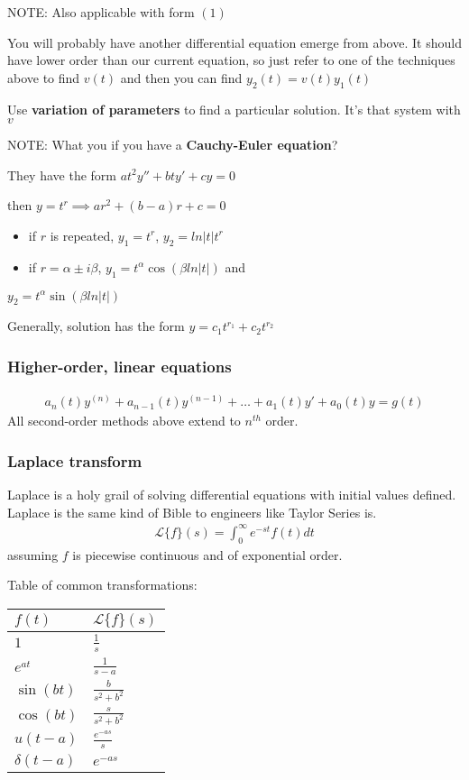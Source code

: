 \documentclass[12pt]{article}
\begin{document}
NOTE: Also applicable with form \((1)\)

You will probably have another differential equation emerge from above. It
should have lower order than our current equation, so just refer to one of
the techniques above to find \(v(t)\) and then you can find
\(y_2(t)=v(t)y_1(t)\)

Use \textbf{variation of parameters} to find a particular solution. It's that
system with \(v\)

NOTE: What you if you have a \textbf{Cauchy-Euler equation}?

They have the form \(at^2y''+bty'+cy=0\)

then \(y=t^r \implies ar^2+(b-a)r+c=0\)

\begin{itemize}
\item if \(r\) is repeated, \(y_1=t^r\), \(y_2=ln|t|t^r\)
\item if \(r=\alpha\pm i\beta\), \(y_1=t^{\alpha}\cos(\beta ln|t|)\) and
\end{itemize}
\(y_2=t^{\alpha}\sin(\beta ln|t|)\)

Generally, solution has the form \(y=c_1t^{r_1}+c_2t^{r_2}\)

\subsubsection*{Higher-order, linear equations}
\label{sec:org49301f3}
\begin{align*}
	a_n(t)y^{(n)}+a_{n-1}(t)y^{(n-1)}+\ldots+a_1(t)y'+a_0(t)y=g(t)
\end{align*}
All second-order methods above extend to \(n^{th}\) order.

\subsubsection*{Laplace transform}
\label{sec:org459359c}
Laplace is a holy grail of solving differential equations with initial
values defined. Laplace is the same kind of Bible to engineers like Taylor
Series is. 
\begin{align*}
\mathcal{L}\{f\}(s) = \int_0^{\infty} e^{-st} f(t) dt
\end{align*}
assuming \(f\) is piecewise continuous and of exponential order.

Table of common transformations:

\begin{center}
\begin{tabular}{ll}
\(f(t)\) & \(\mathcal{L}\{f\}(s)\)\\
\hline
\(1\) & \(\frac{1}{s}\)\\
\(e^{at}\) & \(\frac{1}{s-a}\)\\
\(\sin(bt)\) & \(\frac{b}{s^2+b^2}\)\\
\(\cos(bt)\) & \(\frac{s}{s^2+b^2}\)\\
\(u(t-a)\) & \(\frac{e^{-as}}{s}\)\\
\(\delta(t-a)\) & \(e^{-as}\)\\
\end{tabular}
\end{center}
\end{document}
